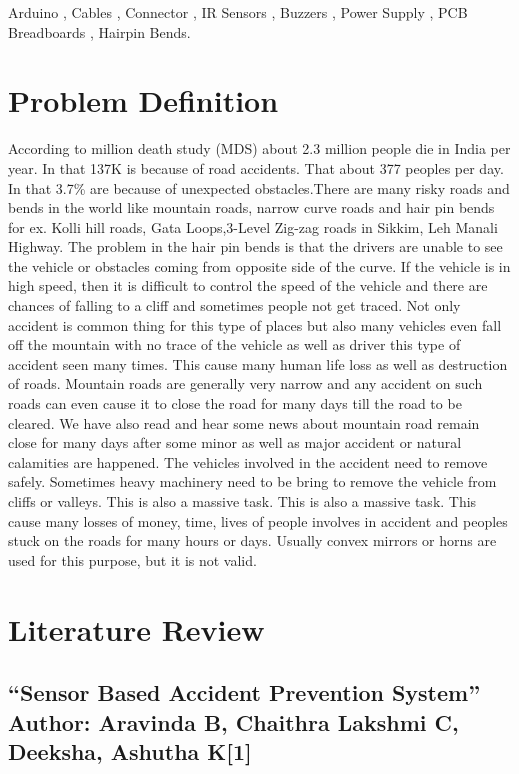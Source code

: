 \documentclass[conference]{IEEEtran}
\begin{document}
    \begin{IEEEkeywords}
        Arduino , Cables , Connector , IR Sensors , Buzzers , Power Supply , PCB Breadboards , Hairpin Bends.
    \end{IEEEkeywords}

    \section{Problem Definition}
    According to million death study (MDS) about 2.3 million people die in India per year. In that 137K is because of road accidents.
    That about 377 peoples per day. In that 3.7\% are because of unexpected obstacles.There are many risky roads and bends in the world
    like mountain roads, narrow curve roads and hair pin bends for ex. Kolli hill roads, Gata Loops,3-Level Zig-zag roads in Sikkim,
    Leh Manali Highway.
    The problem in the hair pin bends is that the drivers are unable to see the vehicle or obstacles coming from opposite side of the
    curve. If the vehicle is in high speed, then it is difficult to control the speed of the vehicle and there are chances of falling to a cliff
    and sometimes people not get traced. Not only accident is common thing for this type of places but also many vehicles even fall off
    the mountain with no trace of the vehicle as well as driver this type of accident seen many times. This cause many human life loss as
    well as destruction of roads. Mountain roads are generally very narrow and any accident on such roads can even cause it to close the
    road for many days till the road to be cleared. We have also read and hear some news about mountain road remain close for many
    days after some minor as well as major accident or natural calamities are happened. The vehicles involved in the accident need to
    remove safely.
    Sometimes heavy machinery need to be bring to remove the vehicle from cliffs or valleys. This is also a massive task. This is also a
    massive task. This cause many losses of money, time, lives of people involves in accident and peoples stuck on the roads for
    many hours or days. Usually convex mirrors or horns are used for this purpose, but it is not valid.

    \section{Literature Review}

    \subsection{“Sensor Based Accident Prevention System” Author: Aravinda B, Chaithra Lakshmi C, Deeksha, Ashutha K[1]}
\end{document}
